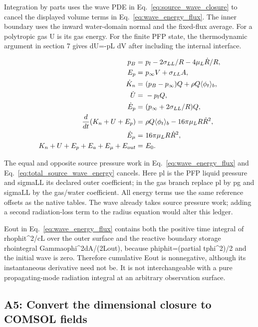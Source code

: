 \documentclass[11pt]{article}
\begin{document}
Integration by parts uses the wave PDE in Eq.~\eqref{eq:source_wave_closure} to cancel the displayed volume terms in Eq.~\eqref{eq:wave_energy_flux}. The inner boundary uses the inward water-domain normal and the fixed-flux average. For a polytropic gas U is its gas energy. For the finite PFP state, the thermodynamic argument in section 7 gives dU=-pL dV after including the internal interface.

\begin{align}
p_B= & ~p_l-2\sigma_{LL}/R-4\mu_L\dot R/R, \notag \\
E_p= & ~p_\infty V+\sigma_{LL}A, \notag \\
\dot K_n= & ~(p_B-p_\infty)Q+\rho Q\langle\phi_t\rangle_b, \notag \\
\dot U= & ~-p_lQ, \notag \\
\dot E_p= & ~(p_\infty+2\sigma_{LL}/R)Q, \notag \\
\frac{d}{dt}(K_n+U+E_p)= & ~\rho Q\langle\phi_t\rangle_b-16\pi\mu_LR\dot R^2, \notag \\
\dot E_\mu= & ~16\pi\mu_LR\dot R^2, \notag \\
K_n+U+E_p+E_a+E_\mu+E_{out}= & ~E_0. \label{eq:total_source_wave_energy}
\end{align}

The equal and opposite source pressure work in Eq.~\eqref{eq:wave_energy_flux} and Eq.~\eqref{eq:total_source_wave_energy} cancels. Here pl is the PFP liquid pressure and sigmaLL its declared outer coefficient; in the gas branch replace pl by pg and sigmaLL by the gas/water coefficient. All energy terms use the same reference offsets as the native tables. The wave already takes source pressure work; adding a second radiation-loss term to the radius equation would alter this ledger.

Eout in Eq.~\eqref{eq:wave_energy_flux} contains both the positive time integral of rhophit\textasciicircum{}2/cL over the outer surface and the reactive boundary storage rhointegral Gammaophi\textasciicircum{}2dA/(2Lout), because phiphit=(partial tphi\textasciicircum{}2)/2 and the initial wave is zero. Therefore cumulative Eout is nonnegative, although its instantaneous derivative need not be. It is not interchangeable with a pure propagating-mode radiation integral at an arbitrary observation surface.

\subsection{A5: Convert the dimensional closure to COMSOL fields}
\end{document}
